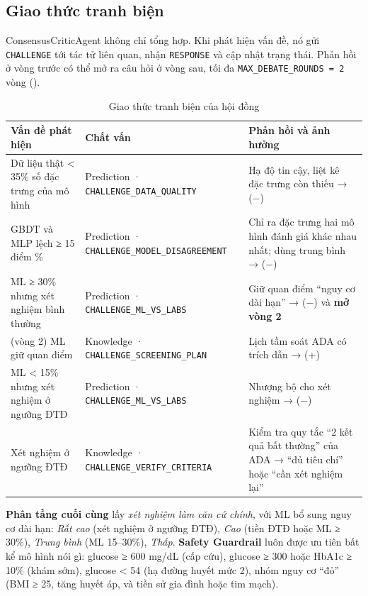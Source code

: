 \subsection{Giao thức tranh biện}

ConsensusCriticAgent không chỉ tổng hợp. Khi phát hiện vấn đề, nó gửi \texttt{CHALLENGE} tới tác tử liên quan, nhận \texttt{RESPONSE} và cập nhật trạng thái. Phản hồi ở vòng trước có thể mở ra câu hỏi ở vòng sau, tối đa \texttt{MAX\_DEBATE\_ROUNDS = 2} vòng ().

\begin{table}[H]
\centering
\caption{Giao thức tranh biện của hội đồng}
\label{tab:debate}
\small
\begin{tabularx}{\linewidth}{@{}L{3.6cm}L{3.9cm}Y@{}}
\toprule
\textbf{Vấn đề phát hiện} & \textbf{Chất vấn} & \textbf{Phản hồi và ảnh hưởng} \\
\midrule
Dữ liệu thật < 35\% số đặc trưng của mô hình & Prediction · \texttt{CHALLENGE\_DATA\_QUALITY} & Hạ độ tin cậy, liệt kê đặc trưng còn thiếu → (−) \\
GBDT và MLP lệch ≥ 15 điểm \% & Prediction · \texttt{CHALLENGE\_MODEL\_DISAGREEMENT} & Chỉ ra đặc trưng hai mô hình đánh giá khác nhau nhất; dùng trung bình → (−) \\
ML ≥ 30\% nhưng xét nghiệm bình thường & Prediction · \texttt{CHALLENGE\_ML\_VS\_LABS} & Giữ quan điểm ``nguy cơ dài hạn'' → (−) và \textbf{mở vòng 2} \\
(vòng 2) ML giữ quan điểm & Knowledge · \texttt{CHALLENGE\_SCREENING\_PLAN} & Lịch tầm soát ADA có trích dẫn → (+) \\
ML < 15\% nhưng xét nghiệm ở ngưỡng ĐTĐ & Prediction · \texttt{CHALLENGE\_ML\_VS\_LABS} & Nhượng bộ cho xét nghiệm → (−) \\
Xét nghiệm ở ngưỡng ĐTĐ & Knowledge · \texttt{CHALLENGE\_VERIFY\_CRITERIA} & Kiểm tra quy tắc ``2 kết quả bất thường'' của ADA → ``đủ tiêu chí'' hoặc ``cần xét nghiệm lại'' \\
\bottomrule
\end{tabularx}
\end{table}

\textbf{Phân tầng cuối cùng} lấy \emph{xét nghiệm làm căn cứ chính}, với ML bổ sung nguy cơ dài hạn: \emph{Rất cao} (xét nghiệm ở ngưỡng ĐTĐ), \emph{Cao} (tiền ĐTĐ hoặc ML ≥ 30\%), \emph{Trung bình} (ML 15–30\%), \emph{Thấp}. \textbf{Safety Guardrail} luôn được ưu tiên bất kể mô hình nói gì: glucose ≥ 600 mg/dL (cấp cứu), glucose ≥ 300 hoặc HbA1c ≥ 10\% (khám sớm), glucose < 54 (hạ đường huyết mức 2), nhóm nguy cơ ``đỏ'' (BMI ≥ 25, tăng huyết áp, và tiền sử gia đình hoặc tim mạch).

